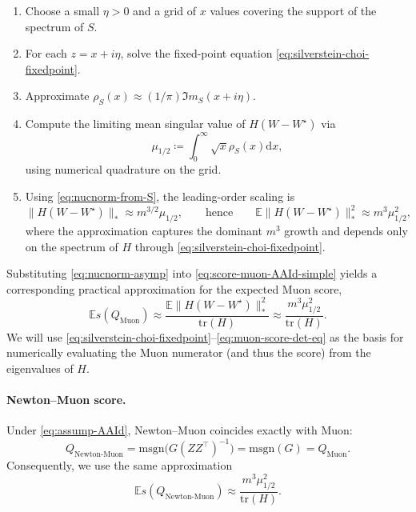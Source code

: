 \documentclass[11pt]{article}
\begin{document}
\begin{enumerate}
\item Choose a small $\eta>0$ and a grid of $x$ values covering the support of the spectrum of ${S}$.
\item For each $z=x+i\eta$, solve the fixed-point equation \eqref{eq:silverstein-choi-fixedpoint}.
\item Approximate $\rho_S(x)\approx (1/\pi)\Im m_S(x+i\eta)$.
\item Compute the limiting mean singular value of ${H}({W}-W^\star)$ via
\[
  \mu_{1/2}
   \coloneqq 
  \int_0^\infty \sqrt{x} \rho_S(x) \mathrm{d}x,
\]
using numerical quadrature on the grid.
\item Using \eqref{eq:nucnorm-from-S}, the leading-order scaling is
\begin{equation}
  \label{eq:nucnorm-asymp}
  \|{H}({W}-W^\star)\|_\ast
   \approx 
  m^{3/2} \mu_{1/2},
  \qquad
  \text{hence}\qquad
  \mathbb{E}\|{H}({W}-W^\star)\|_\ast^{ 2}
   \approx 
  m^{3} \mu_{1/2}^{ 2},
\end{equation}
where the approximation captures the dominant $m^3$ growth and depends only on the spectrum of ${H}$ through \eqref{eq:silverstein-choi-fixedpoint}.
\end{enumerate}
Substituting \eqref{eq:nucnorm-asymp} into \eqref{eq:score-muon-AAId-simple} yields a corresponding practical approximation for the
expected Muon score,
\begin{equation}
  \label{eq:muon-score-det-eq}
  \mathbb{E} s ({Q}_{\mathrm{Muon}})
   \approx 
  \frac{\mathbb{E}\|{H}({W}-W^\star)\|_\ast^{ 2}}{\mathrm{tr}({H})}
   \approx 
  \frac{m^{3} \mu_{1/2}^{ 2}}{\mathrm{tr}({H})}.
\end{equation}
We will use \eqref{eq:silverstein-choi-fixedpoint}--\eqref{eq:muon-score-det-eq} as the basis for numerically evaluating the Muon
numerator (and thus the score) from the eigenvalues of ${H}$.

\paragraph{Newton--Muon score.}
Under \eqref{eq:assump-AAId}, Newton--Muon coincides exactly with Muon:
\[
  {Q}_{\mathrm{Newton\text{-}Muon}}
   =
  \mathrm{msgn}\big({G}({Z}{Z}^\top)^{-1}\big)
   =
  \mathrm{msgn}({G})
   =
  {Q}_{\mathrm{Muon}}.
\]
Consequently, we use the same approximation
\begin{equation}
  \label{eq:newton-muon-score-det-eq}
  \mathbb{E} s ({Q}_{\mathrm{Newton\text{-}Muon}})
   \approx
  \frac{m^{3} \mu_{1/2}^{ 2}}{\mathrm{tr}({H})}.
\end{equation}
\end{document}
